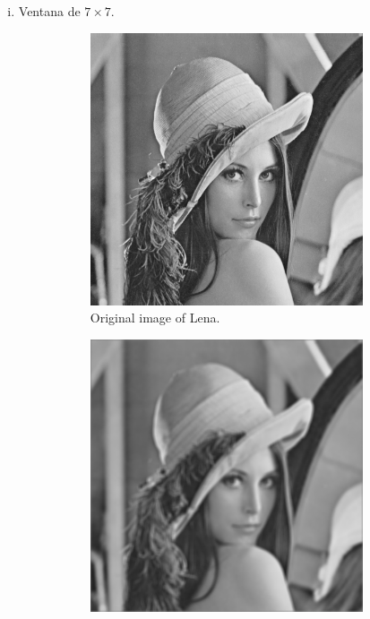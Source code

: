 \documentclass{article}
\theoremstyle{problemstyle}
\begin{document}
\begin{problem}
\begin{enumerate}[a)]
\begin{enumerate}[i)]
		      \item Ventana de $ 7\times 7 $.
		            \begin{figure}[H]
			            \begin{subfigure}{.45\textwidth}
				            \centering
				            \includegraphics[width=0.95\textwidth]{lena_ascii.png}
				            \caption{Original image of Lena.}
			            \end{subfigure}
			            \hfill
			            \begin{subfigure}{.45\textwidth}
				            \centering
				            \includegraphics[width=0.95\textwidth]{lena_mean_7x7.png}

\end{subfigure}
\end{figure}
\end{enumerate}
\end{enumerate}
\end{problem}
\end{document}
